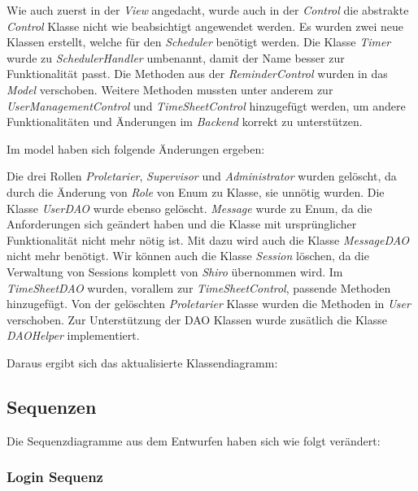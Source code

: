 Wie auch zuerst in der \emph{View} angedacht, wurde auch in der \emph{Control} die abstrakte \emph{Control} Klasse 
nicht wie beabsichtigt angewendet werden.
Es wurden zwei neue Klassen erstellt, welche für den \emph{Scheduler} benötigt werden. 
Die Klasse \emph{Timer} wurde zu \emph{SchedulerHandler} umbenannt, damit der Name besser zur Funktionalität passt.
Die Methoden aus der \emph{ReminderControl} wurden in das \emph{Model} verschoben.
Weitere Methoden mussten unter anderem zur \emph{UserManagementControl} und \emph{TimeSheetControl} hinzugefügt werden, 
um andere Funktionalitäten und Änderungen im \emph{Backend} korrekt zu unterstützen.

Im model haben sich folgende Änderungen ergeben: %

Die drei Rollen \emph{Proletarier}, \emph{Supervisor} und \emph{Administrator} wurden gelöscht, da durch 
die Änderung von \emph{Role} von Enum zu Klasse, sie unnötig wurden. Die Klasse \emph{UserDAO} wurde ebenso gelöscht.
\emph{Message} wurde zu Enum, da die Anforderungen sich geändert haben und 
die Klasse mit ursprünglicher Funktionalität nicht mehr nötig ist. Mit dazu wird auch die Klasse \emph{MessageDAO} nicht mehr benötigt.
Wir können auch die Klasse \emph{Session} löschen, da die Verwaltung von Sessions komplett von \emph{Shiro} übernommen wird.
Im \emph{TimeSheetDAO} wurden, vorallem zur \emph{TimeSheetControl}, passende Methoden hinzugefügt.
Von der gelöschten \emph{Proletarier} Klasse wurden die Methoden in \emph{User} verschoben.
Zur Unterstützung der DAO Klassen wurde zusätlich die Klasse \emph{DAOHelper} implementiert.

Daraus ergibt sich das aktualisierte Klassendiagramm:


\subsection{Sequenzen}
Die Sequenzdiagramme aus dem Entwurfen haben sich wie folgt verändert:
\subsubsection{Login Sequenz}

